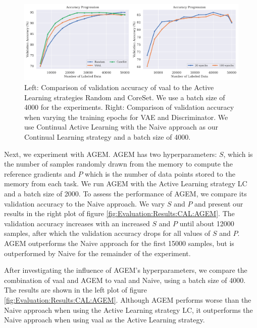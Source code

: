 \begin{figure}[h]
    \centering
    \includegraphics[width=\linewidth]{images/results_CAL/VAAL_plots.png}
    \caption[Continual Active Learning Custom Replay strategy]{Left: Comparison of validation accuracy of \gls{vaal} to the Active Learning strategies Random and CoreSet. We use a batch size of 4000 for the experiments. Right: Comparison of validation accuracy when varying the training 
    epochs for VAE and Discriminator. We use Continual Active Learning with the Naive approach as our Continual Learning strategy and a batch size of 4000.}
    \label{fig:Evaluation:Results:CAL:VAAL}
\end{figure}

Next, we experiment with AGEM. AGEM has two hyperparameters: $S$, which is the number of samples randomly drawn from the memory to compute the reference gradients and $P$ which is the number of data points stored to the memory from each task. We run AGEM with the Active Learning
strategy LC and a batch size of 2000. To assess the performance of AGEM, we compare its validation accuracy to the Naive approach. We vary $S$ and $P$ and present our results in the right plot of figure \ref{fig:Evaluation:Results:CAL:AGEM}. The validation accuracy increases with
an increased $S$ and $P$ until about 12000 samples, after which the validation accuracy drops for all values of $S$ and $P$. AGEM outperforms the Naive approach for the first 15000 samples, but is outperformed by Naive for the remainder of the experiment. \par
After investigating the influence of AGEM's hyperparameters, we compare the combination of \gls{vaal} and AGEM to \gls{vaal} and Naive, using a batch size of 4000. The results are shown in the left plot of figure \ref{fig:Evaluation:Results:CAL:AGEM}. Although AGEM performs worse than the Naive
approach when using the Active Learning strategy LC, it outperforms the Naive approach when using \gls{vaal} as the Active Learning strategy. \par

